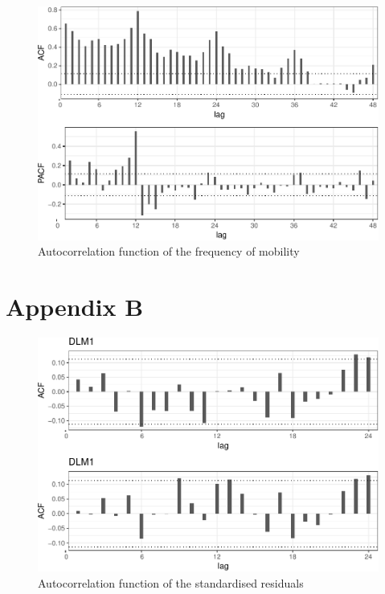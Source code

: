 \documentclass[]{article}
\begin{document}
\begin{figure}
\centering
\includegraphics{../figs/freq--autocorr-plot-1.pdf}
\caption{\label{fig:autocorr-plot}Autocorrelation function of the frequency
of mobility}
\end{figure}

\section{Appendix B}\label{appendix-b}

\begin{figure}
\centering
\includegraphics{../figs/freq--residual-autocorr-1.pdf}
\caption{\label{fig:residual-autocorr}Autocorrelation function of the
standardised residuals}
\end{figure}
\end{document}
